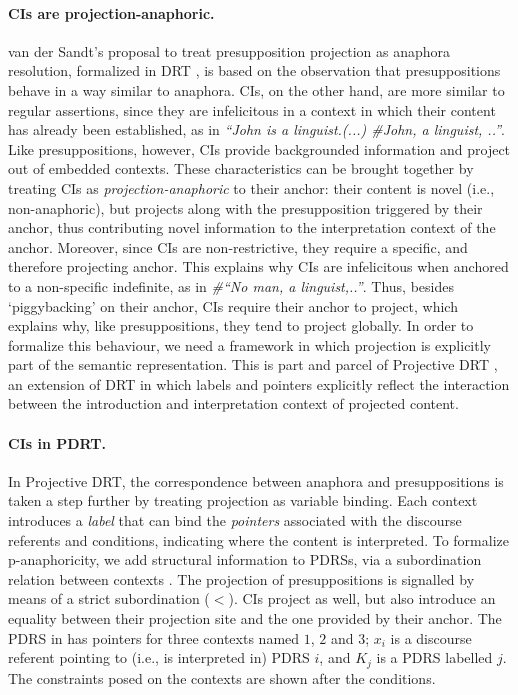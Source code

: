 \documentclass[letterpaper,11pt]{article}
\begin{document}
\paragraph{CIs are projection-anaphoric.} van der Sandt's
\citep{sandt1992presupposition-short} proposal to treat presupposition
projection as anaphora resolution, formalized in DRT
\cite{kamp1981theory-short}, is based on the observation that
presuppositions behave in a way similar to anaphora. CIs, on the other hand,
are more similar to regular assertions, since they are infelicitous in
a context in which their content has already been established, as in
\emph{``John is a linguist.(...) \#John, a linguist, ..''}. Like
presuppositions, however, CIs provide backgrounded information and project
out of embedded contexts. These characteristics can be brought together by
treating CIs as \emph{projection-anaphoric} to their anchor: their content
is novel (i.e., non-anaphoric), but projects along with the presupposition
triggered by their anchor, thus contributing novel information to the
interpretation context of the anchor.  Moreover, since CIs are
non-restrictive, they require a specific, and therefore projecting anchor.
This explains why CIs are infelicitous when anchored to a non-specific
indefinite, as in \emph{\#``No man, a linguist,..''}. Thus, besides
`piggybacking' on their anchor, CIs require their anchor to project, which
explains why, like presuppositions, they tend to project globally.  In order
to formalize this behaviour, we need a framework in which projection is
explicitly part of the semantic representation.  This is part and parcel of
Projective DRT \cite{venhuizen2013iwcs-short}, an extension of DRT
\cite{kamp1981theory-short} in which labels and pointers explicitly reflect
the interaction between the introduction and interpretation context of
projected content.

\paragraph{CIs in PDRT.} In Projective DRT, the correspondence between
anaphora and presuppositions is taken a step further by treating projection
as variable binding. Each context introduces a \emph{label} that can bind
the \emph{pointers} associated with the discourse referents and conditions,
indicating where the content is interpreted. To formalize p-anaphoricity, we
add structural information to PDRSs, via a subordination relation between
contexts \citep[cf.][]{reyle1993dealing-short}.
The projection of presuppositions is signalled by means of a strict
subordination ($<$). CIs project as well, but also introduce an equality
between their projection site and the one provided by their anchor. The PDRS
in \Next has pointers for three contexts named $1$, $2$ and $3$; $x_i$ is
a discourse referent pointing to (i.e., is interpreted in) PDRS $i$, and
$K_j$ is a PDRS labelled $j$. The constraints posed on the contexts are
shown after the conditions. 
\end{document}
